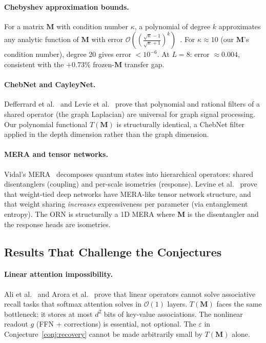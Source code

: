 \documentclass[11pt, a4paper]{article}
\newcommand{\M}{\mathbf{M}}
\newcommand{\bigO}{\mathcal{O}}
\theoremstyle{plain}
\theoremstyle{definition}
\theoremstyle{remark}
\begin{document}
\paragraph{Chebyshev approximation bounds.}
For a matrix $\M$ with condition number $\kappa$, a polynomial of degree $k$ approximates any analytic function of $\M$ with error $\bigO((\frac{\sqrt\kappa - 1}{\sqrt\kappa + 1})^k)$~\cite{trefethen1997numerical}.
For $\kappa \approx 10$ (our $\M$'s condition number), degree 20 gives error $< 10^{-6}$.
At $L = 8$: error $\approx 0.004$, consistent with the $+0.73\%$ frozen-$\M$ transfer gap.

\paragraph{ChebNet and CayleyNet.}
Defferrard et al.~\cite{defferrard2016chebnet} and Levie et al.~\cite{levie2017cayleynet} prove that polynomial and rational filters of a shared operator (the graph Laplacian) are universal for graph signal processing.
Our polynomial functional $T(\M)$ is structurally identical, a ChebNet filter applied in the depth dimension rather than the graph dimension.

\paragraph{MERA and tensor networks.}
Vidal's MERA~\cite{vidal2007mera} decomposes quantum states into hierarchical operators: shared disentanglers (coupling) and per-scale isometries (response).
Levine et al.~\cite{levine2019tensor} prove that weight-tied deep networks have MERA-like tensor network structure, and that weight sharing \emph{increases} expressiveness per parameter (via entanglement entropy).
The ORN is structurally a 1D MERA where $\M$ is the disentangler and the response heads are isometries.

\subsection{Results That Challenge the Conjectures}

\paragraph{Linear attention impossibility.}
Ali et al.~\cite{ali2024linear} and Arora et al.~\cite{arora2024recall} prove that linear operators cannot solve associative recall tasks that softmax attention solves in $\bigO(1)$ layers.
$T(\M)$ faces the same bottleneck: it stores at most $d^2$ bits of key-value associations.
The nonlinear readout $g$ (FFN + corrections) is essential, not optional.
The $\varepsilon$ in Conjecture~\ref{conj:recovery} cannot be made arbitrarily small by $T(\M)$ alone.
\end{document}
